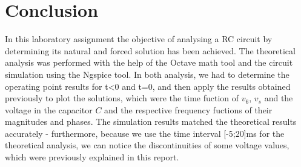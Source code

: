 \section{Conclusion}
\label{sec:conclusion}

In this laboratory assignment the objective of analysing a RC circuit by determining its natural and forced solution has been achieved. The theoretical analysis was performed with the help of the Octave math tool and the circuit simulation using the Ngspice tool. In both analysis, we had to determine the operating point results for t<0 and t=0, and then apply the results obtained previously to plot the solutions, which were the time fuction of $v_6$, $v_s$ and the voltage in the capacitor $C$ and the respective frequency fuctions of their magnitudes and phases. The simulation results matched the theoretical results accurately - furthermore, because we use the time interval [-5;20]ms for the theoretical analysis, we can notice the discontinuities of some voltage values, which were previously explained in this report.
